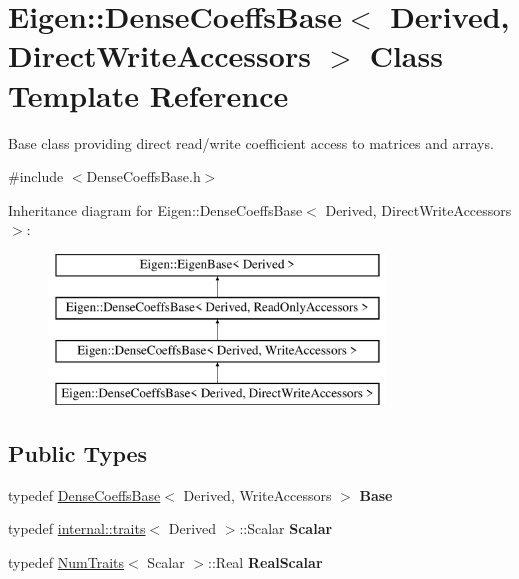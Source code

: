 \hypertarget{class_eigen_1_1_dense_coeffs_base_3_01_derived_00_01_direct_write_accessors_01_4}{}\section{Eigen\+::Dense\+Coeffs\+Base$<$ Derived, Direct\+Write\+Accessors $>$ Class Template Reference}
\label{class_eigen_1_1_dense_coeffs_base_3_01_derived_00_01_direct_write_accessors_01_4}


Base class providing direct read/write coefficient access to matrices and arrays.  




{\ttfamily \#include $<$Dense\+Coeffs\+Base.\+h$>$}

Inheritance diagram for Eigen\+::Dense\+Coeffs\+Base$<$ Derived, Direct\+Write\+Accessors $>$\+:\begin{figure}[H]
\begin{center}
\leavevmode
\includegraphics[height=4.000000cm]{class_eigen_1_1_dense_coeffs_base_3_01_derived_00_01_direct_write_accessors_01_4}
\end{center}
\end{figure}
\subsection*{Public Types}
\begin{DoxyCompactItemize}
\item 
\mbox{\label{class_eigen_1_1_dense_coeffs_base_3_01_derived_00_01_direct_write_accessors_01_4_a745ec4019511a6e2d4e6ff7b947587fc}} 
typedef \mbox{\hyperlink{class_eigen_1_1_dense_coeffs_base}{Dense\+Coeffs\+Base}}$<$ Derived, Write\+Accessors $>$ {\bfseries Base}
\item 
\mbox{\label{class_eigen_1_1_dense_coeffs_base_3_01_derived_00_01_direct_write_accessors_01_4_a87e23d8ff959a337104d617377dddd38}} 
typedef \mbox{\hyperlink{struct_eigen_1_1internal_1_1traits}{internal\+::traits}}$<$ Derived $>$\+::Scalar {\bfseries Scalar}
\item 
\mbox{\label{class_eigen_1_1_dense_coeffs_base_3_01_derived_00_01_direct_write_accessors_01_4_a46a4e0b5f1c5cda37e82f255a38a044b}} 
typedef \mbox{\hyperlink{struct_eigen_1_1_num_traits}{Num\+Traits}}$<$ Scalar $>$\+::Real {\bfseries Real\+Scalar}
\end{DoxyCompactItemize}
